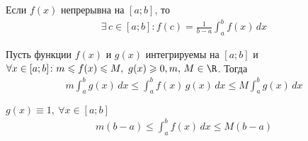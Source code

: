 \begin{theorem}
    Если $f(x)$ непрерывна на $[a;b]$, то
    \begin{gather*}
        \exists\, c \in [a;b]\colon f(c) = \frac{1}{b-a} \int_{a}^{b} f(x)\, dx
    \end{gather*}
\end{theorem}

\newpage
\begin{theorem}
    Пусть функции $f(x)$ и $g(x)$ интегрируемы на $[a;b]$ и $\forall x \in [a;b]\colon m \leqslant f(x) \leqslant M,\ {g(x) \geqslant 0},\break m,\, M \in \R$. Тогда
    \begin{gather*}
        \boxed{m \int_{a}^{b} g(x)\, dx \leqslant \int_{a}^{b} f(x)\, g(x)\, dx \leqslant M \int_{a}^{b} g(x)\, dx}
    \end{gather*}
\end{theorem}

\begin{corollary}
    $g(x) \equiv  1,\ \forall x \in [a;b]$
    \begin{gather*}
        m(b-a) \leqslant \int_{a}^{b} f(x)\, dx \leqslant M(b-a)
    \end{gather*}
\end{corollary}

